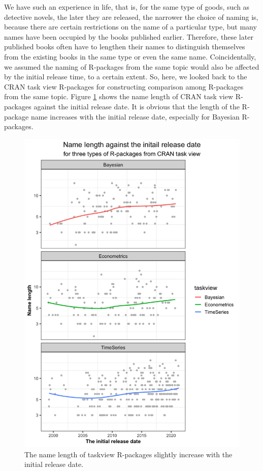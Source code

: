 \documentclass[
]{book}
\begin{document}
We have such an experience in life, that is, for the same type of goods, such as detective novels, the later they are released, the narrower the choice of naming is, because there are certain restrictions on the name of a particular type, but many names have been occupied by the books published earlier. Therefore, these later published books often have to lengthen their names to distinguish themselves from the existing books in the same type or even the same name.
Coincidentally, we assumed the naming of R-packages from the same topic would also be affected by the initial release time, to a certain extent. So, here, we looked back to the CRAN task view R-packages for constructing comparison among R-packages from the same topic. Figure \ref{fig:namelth-taskview} shows the name length of CRAN task view R-packages against the initial release date. It is obvious that the length of the R-package name increases with the initial release date, especially for Bayesian R-packages.



\begin{figure}

{\centering \includegraphics{figures/namelth-taskview-1} 

}

\caption{The name length of taskview R-packages slightly increase with the initial release date.}\label{fig:namelth-taskview}
\end{figure}
\end{document}
